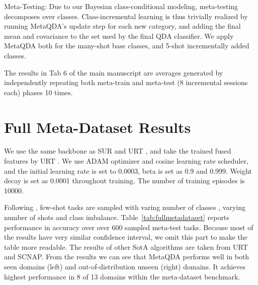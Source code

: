 \documentclass[10pt,twocolumn,letterpaper]{article}
\begin{document}
Meta-Testing: Due to our Bayesian class-conditional modeling, meta-testing decomposes over classes. Class-incremental learning is thus trivially realized by running MetaQDA's update step for each new category, and adding the final mean and covariance to the set used by the final QDA classifier. We apply MetaQDA both for the many-shot base classes, and 5-shot incrementally added classes.

The results in Tab 6 of the main manuscript are averages generated by independently repeating both meta-train and meta-test (8 incremental sessions each) phases 10 times.

\section{Full Meta-Dataset Results}\label{sec:fullMetaDataset}

We use the same backbone as SUR \cite{dvornik2020selecting} and URT \cite{liu2020universal}, and take the trained fused features by URT \cite{liu2020universal}.
We use ADAM optimizer and cosine learning rate scheduler, and the initial learning rate is set to 0.0003, beta is set as 0.9 and 0.999. Weight decay is set as 0.0001 throughout training. The number of training episodes is 10000.

Following \cite{triantafillou2019meta}, few-shot tasks are sampled with varing number of classes , varying number of shots  and class imbalance. Table~\ref{tab:fullmetadataset} reports performance in accuracy over  over 600 sampled meta-test tasks. Because most of the results have very similar confidence interval, we omit this part to make the table more readable.
The results of other SotA algorithms are taken from URT \cite{liu2020universal} and SCNAP\cite{bateni2020improved}. From the results we can see that MetaQDA performs well in both seen domains (left) and out-of-distribution unseen (right) domains. It achieves highest performance in 8 of 13 domains within the meta-dataset benchmark. 
\end{document}
